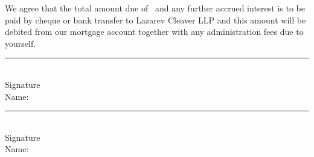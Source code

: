 \documentclass{article}
\begin{document}
\vspace{4 mm}
\noindent We agree that the total amount due of \total\ and any further accrued interest is to be
paid by cheque or bank transfer to Lazarev Cleaver LLP and this amount will be debited from
our mortgage account together with any administration fees due to yourself.

\vspace{6 mm}
\begin{multicols}{2}
\noindent \rule{4cm}{0.15mm}\\
Signature\\
Name:

\columnbreak
\noindent \rule{4cm}{0.15mm}\\
Signature\\
Name:

\end{multicols}
\end{document}
